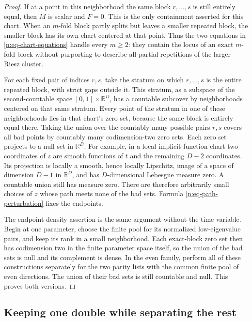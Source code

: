 \begin{proof}
If at a point in this neighborhood the same block \(r,\ldots,s\) is
still entirely equal, then \(M\) is scalar and \(F=0\).  This is the
only containment asserted for this chart.  When an \(m\)-fold block
partly splits but leaves a smaller repeated block, the smaller block
has its own chart centered at that point.  Thus the two equations
in \eqref{n:eq-chart-equations} handle every \(m\geq2\): they contain
the locus of an exact \(m\)-fold block without purporting to describe
all partial repetitions of the larger Riesz cluster.

For each fixed pair of indices \(r,s\), take the stratum on which
\(r,\ldots,s\) is the entire repeated block, with strict gaps outside
it.  This stratum, as a subspace of the second-countable space
\([0,1]\times\mathbb R^D\), has a countable subcover by neighborhoods
centered on that same stratum.  Every point of the stratum in one of
these neighborhoods lies in that chart's zero set, because the same
block is entirely equal there.  Taking the union over the countably
many possible pairs \(r,s\) covers all bad points by countably many
codimension-two zero sets.  Each zero set projects to a null set in
\(\mathbb R^D\).  For example, in a local implicit-function chart
two coordinates of \(z\) are smooth functions of \(t\) and the
remaining \(D-2\) coordinates.  Its projection is locally a smooth,
hence locally Lipschitz, image of a space of dimension \(D-1\) in
\(\mathbb R^D\), and has \(D\)-dimensional Lebesgue measure zero.
A countable union still has measure zero.  There are therefore
arbitrarily small choices of \(z\) whose path meets none of the bad
sets.  Formula \eqref{n:eq-path-perturbation} fixes the endpoints.

The endpoint density assertion is the same argument without the time
variable.  Begin at one parameter, choose the finite pool for its
normalized low-eigenvalue pairs, and keep its rank in a small
neighborhood.  Each exact-block zero set then has codimension two in
the finite parameter space itself, so the union of the bad sets is
null and its complement is dense.  In the even family, perform all
of these constructions separately for the two parity lists with the
common finite pool of even directions.  The union of their bad sets
is still countable and null.  This proves both versions.
\end{proof}

\subsection{Keeping one double while separating the rest}

